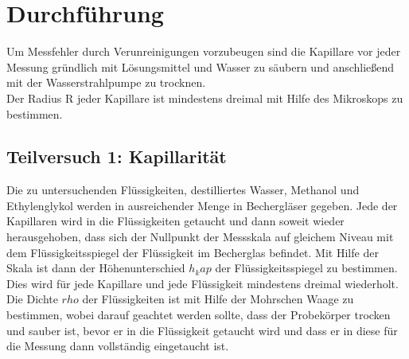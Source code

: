 \documentclass[12pt, a4paper, twoside]{scrartcl}
\begin{document}

\section{Durchführung}
\label{sec:durchfuehrung}

Um Messfehler durch Verunreinigungen vorzubeugen sind die Kapillare vor jeder Messung gründlich mit 
Lösungsmittel und Wasser zu säubern und anschließend mit der Wasserstrahlpumpe zu trocknen. \\
Der Radius R jeder Kapillare ist mindestens dreimal mit Hilfe des Mikroskops zu bestimmen.\\

\subsection{Teilversuch 1: Kapillarität}
Die zu untersuchenden Flüssigkeiten, destilliertes Wasser, Methanol und Ethylenglykol werden in ausreichender Menge in Bechergläser gegeben. Jede der Kapillaren wird in die Flüssigkeiten getaucht und dann soweit wieder herausgehoben, dass sich der Nullpunkt der Messskala auf gleichem Niveau mit dem Flüssigkeitsspiegel der Flüssigkeit im Becherglas befindet. Mit Hilfe der Skala ist dann der Höhenunterschied $h_kap$ der Flüssigkeitsspiegel zu bestimmen. Dies wird für jede Kapillare und jede Flüssigkeit mindestens dreimal wiederholt. \\
Die Dichte $rho$ der Flüssigkeiten ist mit Hilfe der Mohrschen Waage zu bestimmen, wobei darauf geachtet werden sollte, dass der Probekörper trocken und sauber ist, bevor er in die Flüssigkeit getaucht wird und dass er in diese für die Messung dann vollständig eingetaucht ist.\\
\end{document}

